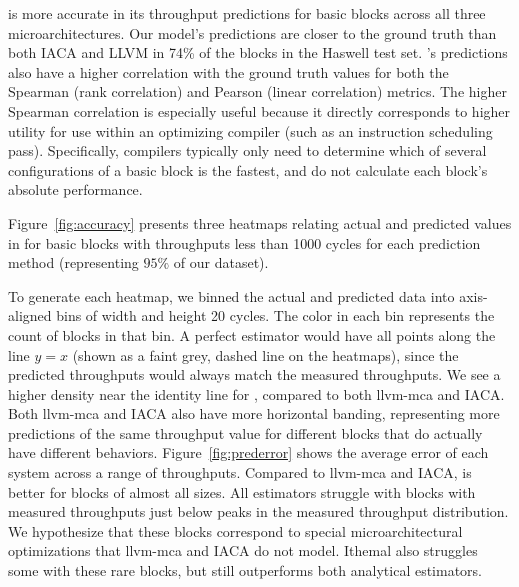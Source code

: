 \tool{} is more accurate in its throughput predictions for basic blocks across all three microarchitectures.
Our model's predictions are closer to the ground truth than both IACA and LLVM in 74\% of the blocks in the Haswell test set.
\tool{}'s predictions also have a higher correlation with the ground truth values for both the Spearman (rank correlation) and Pearson (linear correlation) metrics.
The higher Spearman correlation is especially useful because it directly corresponds to higher utility for use within an optimizing compiler (such as an instruction scheduling pass).
Specifically, compilers typically only need to determine which of several configurations of a basic block is the fastest, and do not calculate each block's absolute performance.

Figure~\ref{fig:accuracy} presents three heatmaps relating actual and predicted values in for basic blocks with throughputs less than 1000 cycles for each prediction method (representing $95\%$ of our dataset).

To generate each heatmap, we binned the actual and predicted data into axis-aligned bins of width and height 20 cycles.
The color in each bin represents the count of blocks in that bin.
A perfect estimator would have all points along the line $y=x$ (shown as a faint grey, dashed line on the heatmaps), since the predicted throughputs would always match the measured throughputs.
We see a higher density near the identity line for \tool{}, compared to both llvm-mca and IACA.
Both llvm-mca and IACA also have more horizontal banding, representing more predictions of the same throughput value for different blocks that do actually have different behaviors.
Figure~\ref{fig:prederror} shows the average error of each system across a range of throughputs.
Compared to llvm-mca and IACA, \tool{} is better for blocks of almost all sizes.
All estimators struggle with blocks with measured throughputs just below peaks
in the measured throughput distribution. We hypothesize that these blocks correspond to special
microarchitectural optimizations that llvm-mca and IACA do not model. Ithemal also struggles
some with these rare blocks, but still outperforms both analytical estimators.

